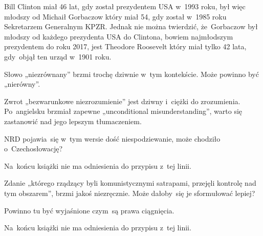 \documentclass[a4paper,11pt]{article}
\begin{document}
\start {} Bill Clinton miał 46 lat, gdy został prezydentem USA
w~1993 roku, był więc młodszy od Michaił Gorbaczow który miał 54, gdy
został w~1985 roku Sekretarzem Generalnym KPZR. Jednak nie można
twierdzić, że~Gorbaczow był młodszy od każdego prezydenta USA do
Clintona, bowiem najmłodszym prezydentem do roku 2017, jest Theodore
Roosevelt który miał tylko 42 lata, gdy~objął ten urząd w~1901 roku.

\vspace{\spaceFour}



\start {} Słowo „niezrównany” brzmi trochę dziwnie
w~tym kontekście. Może powinno być „nierówny”.

\vspace{\spaceFour}



\start {} Zwrot „bezwarunkowe niezrozumienie” jest
dziwny i~ciężki do zrozumienia. Po~angielsku brzmiał zapewne
„unconditional misunderstanding”, warto się zastanowić nad jego
lepszym tłumaczeniem.

\vspace{\spaceFour}



\start {} NRD pojawia~się w~tym wersie dość
niespodziewanie, może chodziło o~Czechosłowację?

\vspace{\spaceFour}



\start {} Na~końcu książki nie ma odniesienia do przypisu
z~tej linii.

\vspace{\spaceFour}



\start {} Zdanie „którego rządzący byli
komunistycznymi satrapami, przejęli kontrolę nad tym obszarem”, brzmi
jakoś niezręcznie. Może dałoby~się je sformułować lepiej?

\vspace{\spaceFour}



\start {} Powinno tu być wyjaśnione czym~są prawa
ciągnięcia.

\vspace{\spaceFour}



\start {} Na~końcu książki nie ma odniesienia do przypisu
z~tej linii.

\vspace{\spaceFour}
\end{document}

